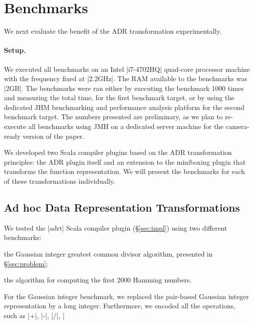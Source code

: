 \section{Benchmarks}
\label{sec:benchmarks}


We next evaluate the benefit of the ADR transformation experimentally.

\paragraph{Setup.} We executed all benchmarks on an Intel |i7-4702HQ| quad-core processor
machine with the frequency fixed at |2.2GHz|. The RAM available to the
benchmarks was |2GB|. The benchmarks were ran either by executing the
benchmark 1000 times and measuring the total time, for the first
benchmark target, or by using the dedicated JHM benchmarking and
performance analysis platform \cite{aleksey_shipilev_openjdk:_????}
for the second benchmark target. The numbers presented are
preliminary, as we plan to re-execute all benchmarks using JMH on a
dedicated server machine for the camera-ready version of the paper.

We developed two Scala compiler plugins based on the ADR
transformation principles: the ADR plugin itself and an extension to
the miniboxing plugin \cite{miniboxing} that transforms the function
representation. We will present the benchmarks for each of these
transformations individually.

\subsection{Ad hoc Data Representation Transformations}
\label{sec:benchmarks:ad-hoc}

We tested the |adrt| Scala compiler plugin (\S\ref{sec:impl}) using two different benchmarks:

\begin{compactitem}
\item the Gaussian integer greatest common divisor algorithm, presented in \S\ref{sec:problem};
\item the algorithm for computing the first 2000 Hamming numbers.
\end{compactitem}

For the Gaussian integer benchmark, we replaced the pair-based Gaussian integer representation by a long integer. Furthermore, we encoded all the operations, such as |+|, |-|, |/|, |%

